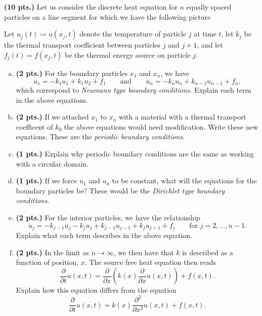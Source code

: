 \documentclass[12pt]{article} %
\begin{document}
\newpage

\begin{problem}
\textbf{(10 pts.)} Let us consider the discrete heat equation for $n$ equally spaced particles on a line segment for which we have the following picture
\begin{figure}[H]
	\centering
	\resizebox{.9\columnwidth}{!}{}
\end{figure}
Let $u_j(t) \coloneqq u(x_j,t)$ denote the temperature of particle $j$ at time $t$, let $k_j$ be the thermal transport coefficient between particles $j$ and $j+1$, and let $f_j(t)=f(x_j,t)$ be the thermal energy source on particle $j$.
\begin{enumerate}[(a)]
    \item \textbf{(2 pts.)} For the boundary particles $x_1$ and $x_n$, we have
    \[
    \dot{u}_1 = -k_1 u_1 + k_1 u_{2} + f_1 \qquad \textrm{and} \qquad \dot{u}_n = -k_n u_{n} + k_{n-1} u_{n-1} +f_n,
    \]
    which correspond to \emph{Neumann type boundary conditions}. Explain each term in the above equations.
    \item \textbf{(2 pts.)} If we attached $x_1$ to $x_n$ with a material with a thermal transport coefficent of $k_0$ the above equations would need modification. Write these new equations. These are the \emph{periodic boundary conditions}. 
    \item \textbf{(1 pts.)} Explain why periodic boundary conditions are the same as working with a circular domain.
    \item \textbf{(1 pts.)} If we force $u_1$ and $u_n$ to be constant, what will the equations for the boundary particles be? These would be the \emph{Dirichlet type boundary conditions}.
    \item \textbf{(2 pts.)} For the interior particles, we have the relationship
    \[
    \dot{u}_j = -k_{j-1}u_j - k_{j} u_j + k_{j-1}u_{j-1} + k_{j} u_{j+1} +f_j \qquad \textrm{for $j=2,\dots,n-1$}.
    \]
    Explain what each term describes in the above equation.
    \item \textbf{(2 pts.)} In the limit as $n\to \infty$, we then have that $k$ is described as a function of position, $x$. The source free heat equation then reads
    \[
    \frac{\partial}{\partial t}u(x,t) = \frac{\partial}{\partial x} \left( k(x)\frac{\partial}{\partial x} u(x,t) \right) + f(x,t).
    \]
    Explain how this equation differs from the equation
    \[
    \frac{\partial}{\partial t}u(x,t) = k(x) \frac{\partial^2}{\partial x^2} u(x,t)+f(x,t).
    \]
\end{enumerate}
\end{problem}
\end{document}
